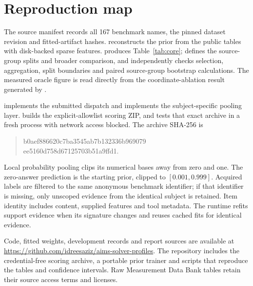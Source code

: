 \documentclass{article}
\begin{document}
\section{Reproduction map}
The source manifest records all 167 benchmark names, the pinned dataset revision and fitted-artifact hashes.  reconstructs the prior from the public tables with disk-backed sparse features.  produces Table~\ref{tab:core};  defines the source-group splits and broader comparison, and  independently checks selection, aggregation, split boundaries and paired source-group bootstrap calculations. The measured oracle figure is read directly from the coordinate-ablation result generated by .

 implements the submitted dispatch and  implements the subject-specific pooling layer.  builds the explicit-allowlist scoring ZIP, and  tests that exact archive in a fresh process with network access blocked. The archive SHA-256 is
\begin{quote}\small\ttfamily
b0aef886620c7ba3545ab7b132336b969079\\
ee5160d758d67125703b51a9ffd1.
\end{quote}
Local probability pooling clips its numerical bases away from zero and one. The zero-answer prediction is the starting prior, clipped to $[0.001,0.999]$. Acquired labels are filtered to the same anonymous benchmark identifier; if that identifier is missing, only unscoped evidence from the identical subject is retained. Item identity includes content, supplied features and tool metadata. The runtime refits support evidence when its signature changes and reuses cached fits for identical evidence.

Code, fitted weights, development records and report sources are available at \url{https://github.com/idreesaziz/aims-solver-profiles}. The repository includes the credential-free scoring archive, a portable prior trainer and scripts that reproduce the tables and confidence intervals. Raw Measurement Data Bank tables retain their source access terms and licenses.
\end{document}
